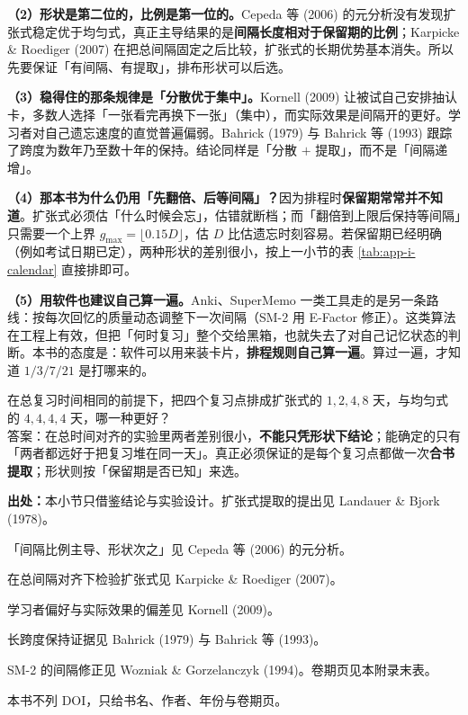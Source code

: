 \textbf{（2）形状是第二位的，比例是第一位的。}Cepeda 等 (2006) 的元分析没有发现扩张式稳定优于均匀式，真正主导结果的是\textbf{间隔长度相对于保留期的比例}；Karpicke \& Roediger (2007) 在把总间隔固定之后比较，扩张式的长期优势基本消失。所以先要保证「有间隔、有提取」，排布形状可以后选。

\textbf{（3）稳得住的那条规律是「分散优于集中」。}Kornell (2009) 让被试自己安排抽认卡，多数人选择「一张看完再换下一张」（集中），而实际效果是间隔开的更好。学习者对自己遗忘速度的直觉普遍偏弱。Bahrick (1979) 与 Bahrick 等 (1993) 跟踪了跨度为数年乃至数十年的保持。结论同样是「分散 $+$ 提取」，而不是「间隔递增」。

\textbf{（4）那本书为什么仍用「先翻倍、后等间隔」？}因为排程时\textbf{保留期常常并不知道}。扩张式必须估「什么时候会忘」，估错就断档；而「翻倍到上限后保持等间隔」只需要一个上界 $g_{\max}=\lfloor0.15D\rfloor$，估 $D$ 比估遗忘时刻容易。若保留期已经明确（例如考试日期已定），两种形状的差别很小，按上一小节的表 \ref{tab:app-i-calendar} 直接排即可。

\textbf{（5）用软件也建议自己算一遍。}Anki、SuperMemo 一类工具走的是另一条路线：按每次回忆的质量动态调整下一次间隔（SM-2 用 E-Factor 修正）。这类算法在工程上有效，但把「何时复习」整个交给黑箱，也就失去了对自己记忆状态的判断。本书的态度是：软件可以用来装卡片，\textbf{排程规则自己算一遍}。算过一遍，才知道 $1/3/7/21$ 是打哪来的。

\begin{miniquiz}
在总复习时间相同的前提下，把四个复习点排成扩张式的 $1,2,4,8$ 天，与均匀式的 $4,4,4,4$ 天，哪一种更好？\\
答案：在总时间对齐的实验里两者差别很小，\textbf{不能只凭形状下结论}；能确定的只有「两者都远好于把复习堆在同一天」。真正必须保证的是每个复习点都做一次\textbf{合书提取}；形状则按「保留期是否已知」来选。
\end{miniquiz}

{\footnotesize
\textbf{出处：}本小节只借鉴结论与实验设计。扩张式提取的提出见 Landauer \& Bjork (1978)。

「间隔比例主导、形状次之」见 Cepeda 等 (2006) 的元分析。

在总间隔对齐下检验扩张式见 Karpicke \& Roediger (2007)。

学习者偏好与实际效果的偏差见 Kornell (2009)。

长跨度保持证据见 Bahrick (1979) 与 Bahrick 等 (1993)。

SM-2 的间隔修正见 Wozniak \& Gorzelanczyk (1994)。卷期页见本附录末表。

本书不列 DOI，只给书名、作者、年份与卷期页。
}

